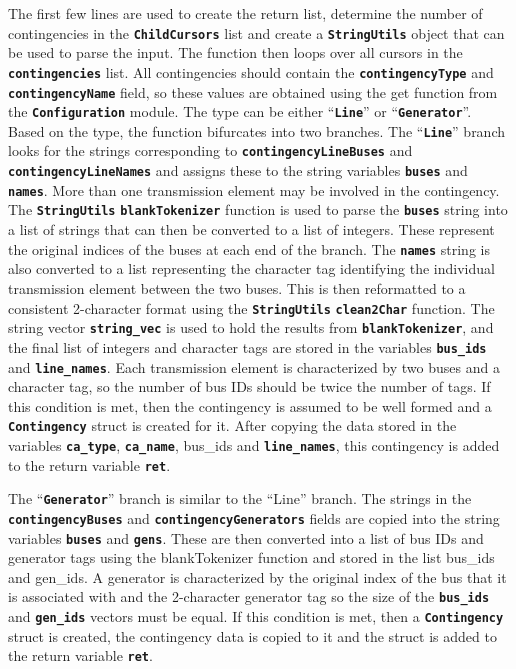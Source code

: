 \documentclass[12pt]{report} %
\begin{document}
The first few lines are used to create the return list, determine the number of contingencies in the \texttt{\textbf{ChildCursors}} list and create a \texttt{\textbf{StringUtils}} object that can be used to parse the input. The function then loops over all cursors in the \texttt{\textbf{contingencies}} list. All contingencies should contain the \texttt{\textbf{contingencyType}} and \texttt{\textbf{contingencyName}} field, so these values are obtained using the get function from the \texttt{\textbf{Configuration}} module. The type can be either ``\texttt{\textbf{Line}}'' or ``\texttt{\textbf{Generator}}''. Based on the type, the function bifurcates into two branches. The ``\texttt{\textbf{Line}}'' branch looks for the strings corresponding to \texttt{\textbf{contingencyLineBuses}} and \texttt{\textbf{contingencyLineNames}} and assigns these to the string variables \texttt{\textbf{buses}} and \texttt{\textbf{names}}. More than one transmission element may be involved in the contingency. The \texttt{\textbf{StringUtils}} \texttt{\textbf{blankTokenizer}} function is used to parse the \texttt{\textbf{buses}} string into a list of strings that can then be converted to a list of integers. These represent the original indices of the buses at each end of the branch. The \texttt{\textbf{names}} string is also converted to a list representing the character tag identifying the individual transmission element between the two buses. This is then reformatted to a consistent 2-character format using the \texttt{\textbf{StringUtils}} \texttt{\textbf{clean2Char}} function. The string vector \texttt{\textbf{string\_vec}} is used to hold the results from \texttt{\textbf{blankTokenizer}}, and the final list of integers and character tags are stored in the variables \texttt{\textbf{bus\_ids}} and \texttt{\textbf{line\_names}}. Each transmission element is characterized by two buses and a character tag, so the number of bus IDs should be twice the number of tags. If this condition is met, then the contingency is assumed to be well formed and a \texttt{\textbf{Contingency}} struct is created for it. After copying the data stored in the variables \texttt{\textbf{ca\_type}}, \texttt{\textbf{ca\_name}}, bus\_ids and \texttt{\textbf{line\_names}}, this contingency is added to the return variable \texttt{\textbf{ret}}.

The ``\texttt{\textbf{Generator}}'' branch is similar to the ``Line'' branch. The strings in the \texttt{\textbf{contingencyBuses}} and \texttt{\textbf{contingencyGenerators}} fields are copied into the string variables \texttt{\textbf{buses}} and \texttt{\textbf{gens}}. These are then converted into a list of bus IDs and generator tags using the blankTokenizer function and stored in the list bus\_ids and gen\_ids. A generator is characterized by the original index of the bus that it is associated with and the 2-character generator tag so the size of the \texttt{\textbf{bus\_ids}} and \texttt{\textbf{gen\_ids}} vectors must be equal. If this condition is met, then a \texttt{\textbf{Contingency}} struct is created, the contingency data is copied to it and the struct is added to the return variable \texttt{\textbf{ret}}.
\end{document}
